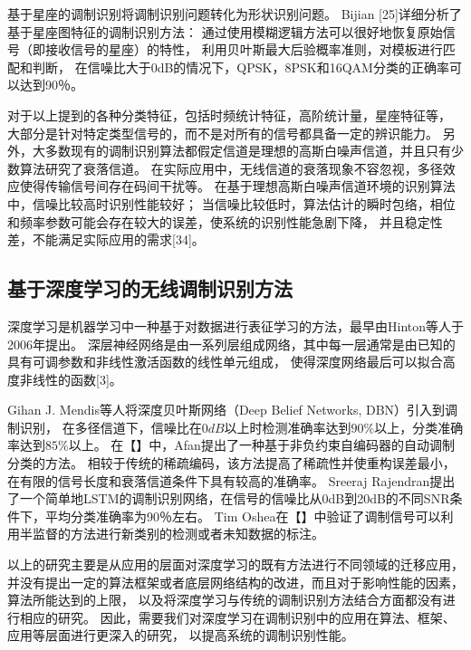 基于星座的调制识别将调制识别问题转化为形状识别问题。
Bijian [25]详细分析了基于星座图特征的调制识别方法：
通过使用模糊逻辑方法可以很好地恢复原始信号（即接收信号的星座）的特性，
利用贝叶斯最大后验概率准则，对模板进行匹配和判断，
在信噪比大于0dB的情况下，QPSK，8PSK和16QAM分类的正确率可以达到90％。\par
 
对于以上提到的各种分类特征，包括时频统计特征，高阶统计量，星座特征等，
大部分是针对特定类型信号的，而不是对所有的信号都具备一定的辨识能力。
另外，大多数现有的调制识别算法都假定信道是理想的高斯白噪声信道，并且只有少数算法研究了衰落信道。
在实际应用中，无线信道的衰落现象不容忽视，多径效应使得传输信号间存在码间干扰等。
在基于理想高斯白噪声信道环境的识别算法中，信噪比较高时识别性能较好；
当信噪比较低时，算法估计的瞬时包络，相位和频率参数可能会存在较大的误差，使系统的识别性能急剧下降，
并且稳定性差，不能满足实际应用的需求[34]。\par

\subsection{基于深度学习的无线调制识别方法}

深度学习是机器学习中一种基于对数据进行表征学习的方法，最早由Hinton等人于2006年提出。
深层神经网络是由一系列层组成网络，其中每一层通常是由已知的具有可调参数和非线性激活函数的线性单元组成，
使得深度网络最后可以拟合高度非线性的函数[3]。\par

Gihan J. Mendis等人将深度贝叶斯网络（Deep Belief Networks, DBN）引入到调制识别，
在多径信道下，信噪比在$0dB$以上时检测准确率达到$90\%$以上，分类准确率达到$85\%$以上。
在【】中，Afan提出了一种基于非负约束自编码器的自动调制分类的方法。
相较于传统的稀疏编码，该方法提高了稀疏性并使重构误差最小，在有限的信号长度和衰落信道条件下具有较高的准确率。
Sreeraj Rajendran提出了一个简单地LSTM的调制识别网络，在信号的信噪比从0dB到20dB的不同SNR条件下，平均分类准确率为90％左右。
Tim Oshea在【】中验证了调制信号可以利用半监督的方法进行新类别的检测或者未知数据的标注。\par

以上的研究主要是从应用的层面对深度学习的既有方法进行不同领域的迁移应用，
并没有提出一定的算法框架或者底层网络结构的改进，而且对于影响性能的因素，算法所能达到的上限，
以及将深度学习与传统的调制识别方法结合方面都没有进行相应的研究。
因此，需要我们对深度学习在调制识别中的应用在算法、框架、应用等层面进行更深入的研究，
以提高系统的调制识别性能。\par

